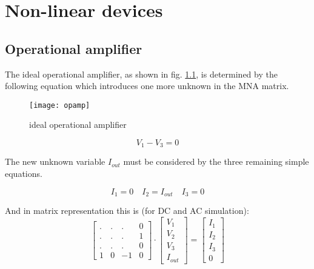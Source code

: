 %
%
%
%


\chapter{Non-linear devices}
\label{sec:NLdevices}


\section{Operational amplifier}

The ideal operational amplifier, as shown in fig. \ref{fig:opamp}, is
determined by the following equation which introduces one more unknown
in the MNA matrix.

\begin{figure}[ht]
\begin{center}
\texttt{[image: opamp]}
\end{center}
\caption{ideal operational amplifier}
\label{fig:opamp}
\end{figure}
\FloatBarrier

\begin{equation}
V_{1} - V_{3} = 0
\label{eq:opamp}
\end{equation}

The new unknown variable $I_{out}$ must be considered by the three
remaining simple equations.

\begin{equation}
I_{1} = 0 \quad I_{2} = I_{out} \quad I_{3} = 0
\end{equation}

And in matrix representation this is (for DC and AC simulation):
\begin{equation}
\begin{bmatrix}
.&.&.& 0\\
.&.&.& 1\\
.&.&.& 0\\
1 & 0 & -1 & 0
\end{bmatrix}
\cdot
\begin{bmatrix}
V_{1}\\
V_{2}\\
V_{3}\\
I_{out}
\end{bmatrix}
=
\begin{bmatrix}
I_{1}\\
I_{2}\\
I_{3}\\
0
\end{bmatrix}
\end{equation}


